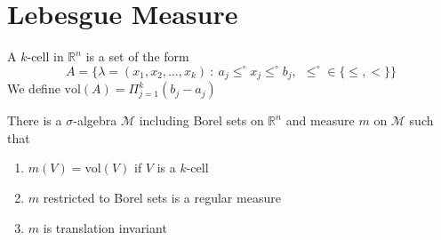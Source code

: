 \section{Lebesgue Measure}

\begin{definition}
A $k$-cell in $\mathbb{R}^n$ is a set of the form \[
  A = \{ \lambda = (x_1 , x_2 , \ldots , x_k)  \ : \ a_j \le^\circ x_j
  \le^\circ b_j, \ \   \le^\circ \in \{ \le, < \} \}
\]
We define $ \textrm{vol}(A) =  \Pi_{j = 1}^k (b_j - a_j)$
\end{definition}

\begin{theorem}
There is a $\sigma$-algebra $\mathcal{M}$ including Borel sets on
$\mathbb{R}^n$ and measure $m$ on $\mathcal{M}$ such that
\begin{enumerate}[label=(\arabic*)]
  \item $m(V) = \textrm{vol}(V)$ if $V$ is a $k$-cell
  \item $m$ restricted to Borel sets is a regular measure
  \item $m$ is translation invariant
\end{enumerate}
\end{theorem}

